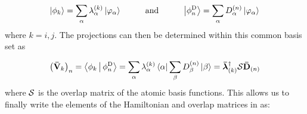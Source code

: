 \begin{equation}
  \Ket{\phi_{k}} = \sum_{\alpha} \lambda^{(k)}_\alpha \Ket{\varphi_\alpha} \hspace{1cm}\text{and}\hspace{1cm}
  \Ket{\phi^\text{D}_n} = \sum_{\alpha} D^{(n)}_\alpha \Ket{\varphi_\alpha}
  \label{eq:dipro_eq18}
\end{equation}
%
where $k=i,j$. The projections can then be determined within this common basis set as

 \begin{equation}
  \begin{aligned}
     \left(\mathbf{ \bar{V} }_k\right)_n=\Braket{\phi_k|\phi^\text{D}_n} = \sum_{\alpha} \lambda^{(k)}_{\alpha} \Bra{\alpha} \sum_{\beta} D^{(n)}_{\beta} \Ket{\beta} = 
     \mathbf{ \bar{\boldsymbol{\lambda}} }_{(k)}^\dagger \mathbf{ \mathcal{S} } \mathbf{ \bar{D} }_{(n)} 
  \end{aligned}
   \label{eq:dipro_eq19}
 \end{equation}
where $\mathbf{ \mathcal{S} }$ is the overlap matrix of the atomic basis functions. This allows us to finally write the elements of the Hamiltonian and overlap matrices in  as:

